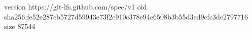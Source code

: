 version https://git-lfs.github.com/spec/v1
oid sha256:fe52e287cb5727d59943e73f2c910c378e94e6508b3b55d3ed9cfc3de2797716
size 87544
